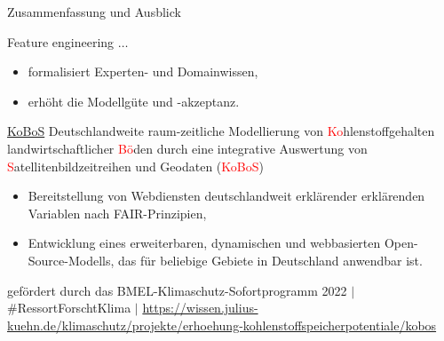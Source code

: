 \begin{frame}{Zusammenfassung und Ausblick}
\begin{alertblock}{Feature engineering $\dots$}
\begin{itemize}
\item formalisiert Experten- und Domainwissen,
\item erhöht die Modellgüte und -akzeptanz.
\end{itemize}
\end{alertblock}
\pause
\begin{block}{\href{https://wissen.julius-kuehn.de/klimaschutz/projekte/erhoehung-kohlenstoffspeicherpotentiale/kobos}{KoBoS}}
Deutschlandweite raum-zeitliche Modellierung von \textcolor{red}{Ko}hlenstoffgehalten
landwirtschaftlicher \textcolor{red}{Bö}den durch eine integrative Auswertung von
\textcolor{red}{S}atellitenbildzeitreihen und Geodaten (\textcolor{red}{KoBoS})
\begin{itemize}
    \item Bereitstellung von Webdiensten deutschlandweit erklärender erklärenden Variablen nach FAIR-Prinzipien,
    \item Entwicklung eines erweiterbaren, dynamischen und webbasierten Open-Source-Modells, das für beliebige Gebiete in Deutschland anwendbar ist.
    \end{itemize}

\tiny gefördert durch das BMEL-Klimaschutz-Sofortprogramm 2022 $|$ \#RessortForschtKlima $|$ \url{https://wissen.julius-kuehn.de/klimaschutz/projekte/erhoehung-kohlenstoffspeicherpotentiale/kobos}
\end{block}


\end{frame}







